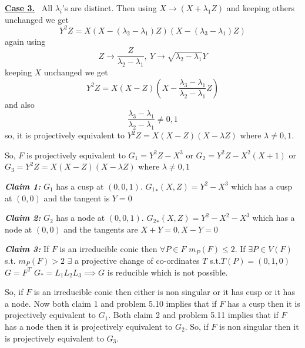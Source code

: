\documentclass[11pt]{article}
\begin{document}
{\begin{enumerate}[label=(\alph*)]
\textbf{\underline{Case 3.}} \  All $\lambda_i$'s are distinct. Then using $X\to (X+\lambda_1 Z)$ and keeping others unchanged we get $$Y^2Z=X(X-(\lambda_2-\lambda_1)Z)(X-(\lambda_3-\lambda_1)Z)$$again  using $$Z\to \frac{Z}{\lambda_2-\lambda_1},\ Y\to\sqrt{\lambda_2-\lambda_1}Y$$ keeping $X$ unchanged we get $$Y^2Z=X(X-Z)(X-\frac{\lambda_3-\lambda_1}{\lambda_2-\lambda_1}Z)$$and also$$\frac{\lambda_3-\lambda_1}{\lambda_2-\lambda_1}\neq 0,1$$so, it is projectively equivalent to $Y^2Z=X(X-Z)(X-\lambda Z)$ where $\lambda\neq 0, 1$. 
\parinn

So, $F$ is projectively equivalent to $G_1=Y^2Z-X^3$ or $G_2=Y^2Z-X^2(X+1)$ or $G_3=Y^2Z=X(X-Z)(X-\lambda Z)$ where $\lambda\neq 0, 1$
\parinf



\textbf{\textit{Claim 1: }}$G_1$ has a cusp at $(0,0,1)$. ${G_1}_*(X,Z)=Y^2-X^3$ which has a cusp at $(0,0)$ and the tangent is $Y=0$

\textbf{\textit{Claim 2: }}$G_2$ has a node at $(0,0,1)$. ${G_2}_*(X,Z)=Y^2-X^2-X^3$ which has a node at $(0,0)$ and the tangents are $X+Y=0,X-Y=0$

\textbf{\textit{Claim 3: }}If $F$ is an irreducible conic then $\forall P\in F$ $m_P(F)\leq 2$. If $\exists P\in V(F)$ s.t. $m_P(F)>2$ $\exists$   a projective change of co-ordinates $T$ s.t.$T(P)=(0,1,0)$ $G=F^T$ $G_*=L_1L_2L_3\implies G$ is reducible which is not possible. 
\parinn

So, if $F$ is an irreducible conic then either is non singular or it has cusp or it has a node. Now both claim 1 and problem 5.10 implies that if $F$ has a cusp then it is projectively equivalent to $G_1$. Both claim 2 and problem 5.11 implies that if $F$ has a node then it is projectively equivalent to $G_2$. So, if $F$ is non singular then it is projectively equivalent to $G_3$.
\end{enumerate}
}
\end{document}
